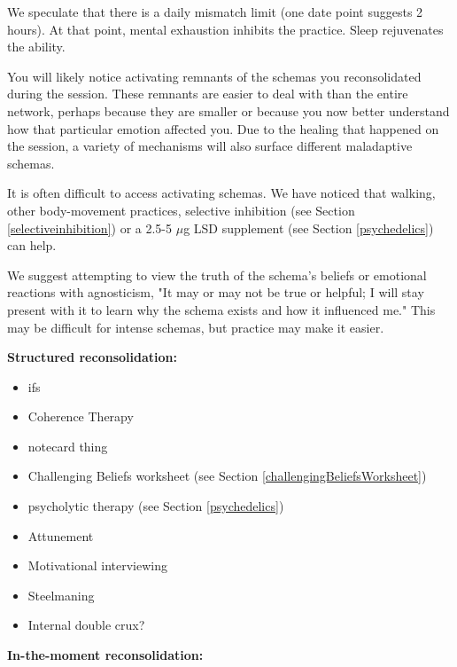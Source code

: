 \documentclass[12pt,letterpaper]{article}
\begin{document}
We speculate that there is a daily mismatch limit (one date point suggests 2 hours). At that point, mental exhaustion inhibits the practice. Sleep rejuvenates the ability.

You will likely notice activating remnants of the schemas you reconsolidated during the session. These remnants are easier to deal with than the entire network, perhaps because they are smaller or because you now better understand how that particular emotion affected you. Due to the healing that happened on the session, a variety of mechanisms will also surface different maladaptive schemas.

It is often difficult to access activating schemas. We have noticed that walking, other body-movement practices, selective inhibition (see Section \ref{selectiveinhibition}) or a 2.5-5 $\mu$g LSD supplement (see Section \ref{psychedelics}) can help.

We suggest attempting to view the truth of the schema's beliefs or emotional reactions with agnosticism, "It may or may not be true or helpful; I will stay present with it to learn why the schema exists and how it influenced me." This may be difficult for intense schemas, but practice may make it easier.

\noindent \textbf{Structured reconsolidation:}

\begin{itemize}
	\item ifs
	\item Coherence Therapy
	\item notecard thing
	\item Challenging Beliefs worksheet (see Section \ref{challengingBeliefsWorksheet})
	\item psycholytic therapy (see Section \ref{psychedelics})
	\item Attunement
	\item Motivational interviewing
	\item Steelmaning
	\item Internal double crux?
\end{itemize}

\noindent \textbf{In-the-moment reconsolidation:}
\end{document}
